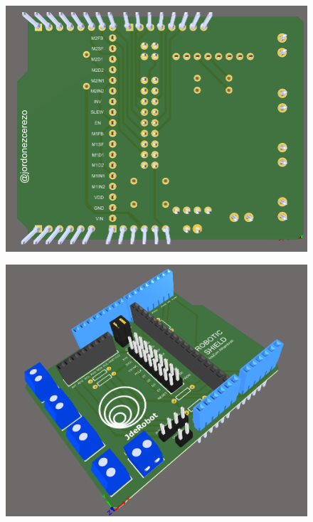 	\begin{center}
		\begin{figure}[H]
			\center
			\includegraphics[scale=0.6]{imagenes/Balancing_Robot/bottom_3D.PNG}
			\caption{}
			\label{fig:bottom_3D}
		\end{figure}
	\end{center}
	
	\begin{center}
		\begin{figure}[H]
			\center
			\includegraphics[scale=0.8]{imagenes/Balancing_Robot/Vista3D1.PNG}
			\caption{}
			\label{fig:Vista3D1}
		\end{figure}
	\end{center}
	
